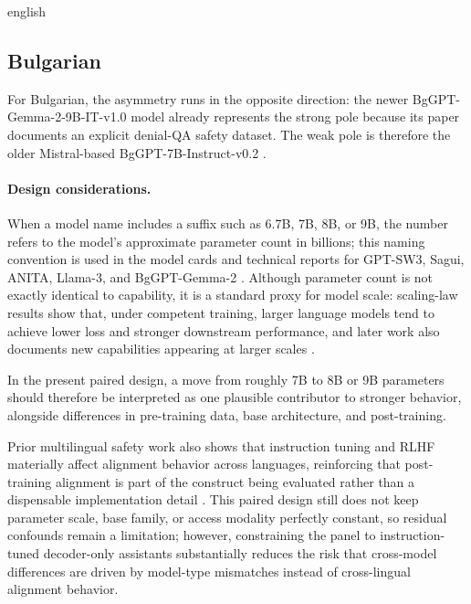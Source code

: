 \begin{otherlanguage*}{english}
\subsection{Bulgarian}

For Bulgarian, the asymmetry runs in the opposite direction: the newer BgGPT-Gemma-2-9B-IT-v1.0 model already represents the strong pole because its paper documents an explicit denial-QA safety dataset. The weak pole is therefore the older Mistral-based BgGPT-7B-Instruct-v0.2 \cite{INSAITInstituteBgGPT7BInstructV022024,alexandrovBgGPT10Extending2024}.


\paragraph*{Design considerations.}

When a model name includes a suffix such as 6.7B, 7B, 8B, or 9B, the number refers to the model's approximate parameter count in billions; this naming convention is used in the model cards and technical reports for GPT-SW3, Sagui, ANITA, Llama-3, and BgGPT-Gemma-2 \cite{ekgren-etal-2024-gpt,OliveiraJLT2024Sagui7BInstruct01,swapUnibaLLaMAntino3ANITA8BInstDPOITA2026,grattafioriLlama3Herd2024,alexandrovBgGPT10Extending2024}. Although parameter count is not exactly identical to capability, it is a standard proxy for model scale: scaling-law results show that, under competent training, larger language models tend to achieve lower loss and stronger downstream performance, and later work also documents new capabilities appearing at larger scales \cite{kaplanScalingLawsNeural,hoffmannTrainingComputeoptimalLarge2022,weiEmergentAbilitiesLarge2022}.

In the present paired design, a move from roughly 7B to 8B or 9B parameters should therefore be interpreted as one plausible contributor to stronger behavior, alongside differences in pre-training data, base architecture, and post-training.

Prior multilingual safety work also shows that instruction tuning and RLHF materially affect alignment behavior across languages, reinforcing that post-training alignment is part of the construct being evaluated rather than a dispensable implementation detail
\cite{shenLanguageBarrierDissecting2024}. This paired design still does not keep parameter scale, base family, or access modality perfectly constant, so residual confounds remain a limitation; however, constraining the panel to instruction-tuned decoder-only assistants substantially reduces the risk that cross-model differences are driven by model-type mismatches instead of cross-lingual alignment behavior.


\end{otherlanguage*}
